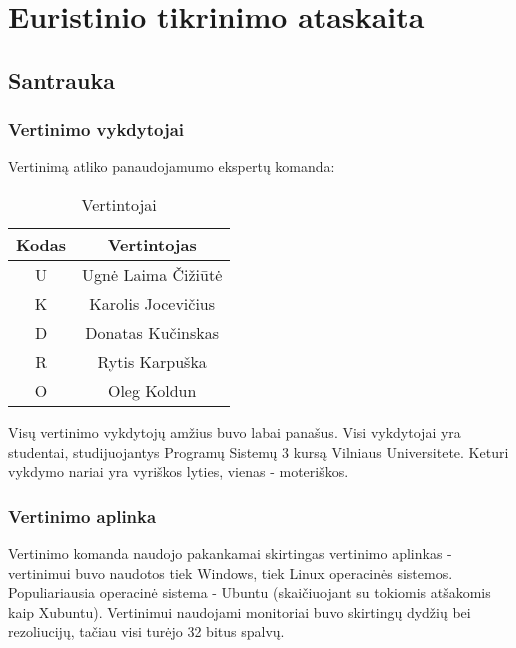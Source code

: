 \section{Euristinio tikrinimo ataskaita}

\subsection{Santrauka}

	\subsubsection{Vertinimo vykdytojai}

	Vertinimą atliko panaudojamumo ekspertų komanda:
	\begin{table}[ht] 
		\caption{Vertintojai} %
		\centering %
		\begin{tabular}{c c} %
			\hline\hline %
			Kodas & Vertintojas\\ [0.5ex] %
			\hline %
			U & Ugnė Laima Čižiūtė\\
			K & Karolis Jocevičius\\
			D & Donatas Kučinskas\\
			R & Rytis Karpuška\\
			O & Oleg Koldun
			\hline %
		\end{tabular} 
		\label{table:nonlin} %
	\end{table} 

	Visų vertinimo vykdytojų amžius buvo labai panašus.
	Visi vykdytojai yra studentai, studijuojantys Programų Sistemų 3 kursą Vilniaus Universitete.
	Keturi vykdymo nariai yra vyriškos lyties, vienas - moteriškos.

	\subsubsection{Vertinimo aplinka}

	Vertinimo komanda naudojo pakankamai skirtingas vertinimo aplinkas - vertinimui buvo naudotos tiek Windows, tiek Linux operacinės sistemos.
	Populiariausia operacinė sistema - Ubuntu (skaičiuojant su tokiomis atšakomis kaip Xubuntu).
	Vertinimui naudojami monitoriai buvo skirtingų dydžių bei rezoliucijų, tačiau visi turėjo 32 bitus spalvų.

